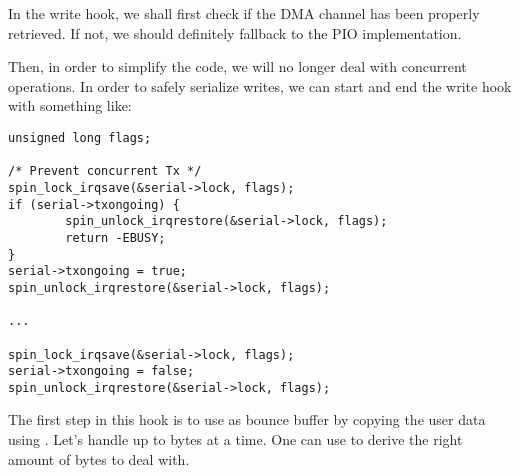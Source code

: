 \if{}\fi

In the write hook, we shall first check if the DMA channel has been
properly retrieved. If not, we should definitely fallback to the PIO
implementation.

Then, in order to simplify the code, we will no longer deal with
concurrent operations. In order to safely serialize writes, we can start
and end the write hook with something like:

\begin{verbatim}
unsigned long flags;

/* Prevent concurrent Tx */
spin_lock_irqsave(&serial->lock, flags);
if (serial->txongoing) {
        spin_unlock_irqrestore(&serial->lock, flags);
        return -EBUSY;
}
serial->txongoing = true;
spin_unlock_irqrestore(&serial->lock, flags);

...

spin_lock_irqsave(&serial->lock, flags);
serial->txongoing = false;
spin_unlock_irqrestore(&serial->lock, flags);
\end{verbatim}

The first step in this  hook is to use  as
bounce buffer by copying the user data using . Let's
handle up to  bytes at a time. One can use 
to derive the right amount of bytes to deal with.

\if{}\else{}\fi

